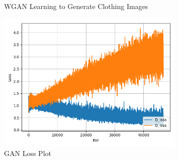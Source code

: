 \documentclass[conference]{IEEEtran}
\begin{document}
    \begin{figure}
        \caption{WGAN Learning to Generate Clothing Images}
        \label{fig:generation-wgan}
        \centering
    \end{figure}

    \begin{figure}
        \caption{GAN Loss Plot}
        \label{fig:loss-plot-gan}
        \includegraphics[width=9cm]{GAN_loss.png}
        \centering
    \end{figure}
\end{document}
